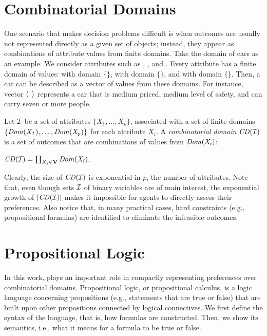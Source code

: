 \section{Combinatorial Domains \label{sec:comb_domains}}
One scenario that makes decision problems difficult is when outcomes
are usually not represented directly as a given set of objects; instead,
they appear as combinations of attribute values from finite domains.
Take the domain of cars as an example.
We consider attributes such as , , and .
Every attribute has a finite domain of values:
 with domain $\{$$\}$,
 with domain $\{$$\}$, and
 with domain $\{$$\}$.
Then, a car can be described as a vector of values from these domains.
For instance, vector $\mathit{\langle}$  $\mathit{\rangle}$ represents
a car that is medium priced, medium level of safety, and can carry seven
or more people.

\begin{definition}
	Let $\mathcal{I}$ be a set of attributes $\{X_1,\ldots,X_p\}$,
	associated with a set of finite domains $\{\it{Dom}(X_1),\ldots,\it{Dom}(X_p)\}$ for each
	attribute $X_i$.
	A \textit{combinatorial domain} $\mathit{CD}(\mathcal{I})$ is a set of outcomes 
	that are combinations of values from $\it{Dom}(X_i)$:
	\begin{center}
		$\mathit{CD}(\mathcal{I}) = \prod_{X_i \in \textbf{V}} \it{Dom}(X_i)$.
	\end{center}
\end{definition}


Clearly, the size of $\mathit{CD}(\mathcal{I})$ is exponential in $p$, the number of attributes.
Note that, even though sets $\mathcal{I}$ of binary variables are of main interest,
the exponential growth of $|\mathit{CD}(\mathcal{I})|$ makes it impossible for agents
to directly assess their preferences.
Also notice that, in many practical cases, hard constraints (e.g., propositional
formulas) are identified to eliminate the infeasible outcomes.



\section{Propositional Logic}
In this work,  plays an important role in compactly representing
preferences over combinatorial domains.
Propositional logic, or propositional calculus, is a logic language concerning
propositions (e.g., statements that are true or false) that are built upon other propositions
connected by logical connectives.
We first define the syntax of the language, that is, how formulas are constructed.
Then, we show its semantics, i.e., what it means for a formula to be true or false.

